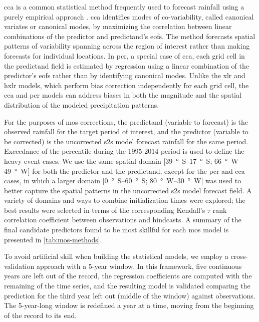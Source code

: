 \documentclass[twocol]{ametsoc}
\begin{document}
\Gls{cca} is a common statistical method frequently used to forecast rainfall using a purely empirical approach \citep{Mason2008,Barnston2012,Jolliffe2012,Barnston1992,Wilks2006}.
\Gls{cca} identifies modes of co-variability, called canonical variates or canonical modes, by maximizing the correlation between linear combinations of the predictor and predictand's \glspl{eof}.
The method forecasts spatial patterns of variability spanning across the region of interest rather than making forecasts for individual locations.
In \gls{pcr}, a special case of \gls{cca}, each grid cell in the predictand field is estimated by regression using a linear combination of the predictor's \glspl{eof} \citep{Mason2008,Wilks2006} rather than by identifying canonical modes.
Unlike the \gls{xlr} and \gls{hxlr} models, which perform bias correction independently for each grid cell, the \gls{cca} and \gls{pcr} models can address biases in both the magnitude and the spatial distribution of the modeled precipitation patterns.

For the purposes of \gls{mos} corrections, the predictand (variable to forecast) is the observed rainfall for the target period of interest, and the predictor (variable to be corrected) is the uncorrected \gls{s2s} model forecast rainfall for the same period.
Exceedance of the  percentile during the 1995-2014 period is used to define the heavy event cases.
We use the same spatial domain [\SIrange{39}{17}{\degree S}; \SIrange{66}{49}{\degree W}] for both the predictor and the predictand, except for the \gls{pcr} and \gls{cca} cases, in which a larger domain [\SIrange{0}{60}{\degree S}; \SIrange{80}{30}{\degree W}] was used to better capture the spatial patterns in the uncorrected \gls{s2s} model forecast field.
A variety of domains and ways to combine initialization times were explored; the best results were selected in terms of the corresponding Kendall's $\tau$ rank correlation coefficient between observations and hindcasts.
A summary of the final candidate predictors found to be most skillful for each \gls{mos} model is presented in \cref{tab:mos-methods}.

To avoid artificial skill when building the statistical models, we employ a cross-validation approach with a 5-year window.
In this framework, five continuous years are left out of the record, the regression coefficients are computed with the remaining of the time series, and the resulting model is validated comparing the prediction for the third year left out (middle of the window) against observations.
The 5-year-long window is redefined a year at a time, moving from the beginning of the record to its end.
\end{document}
